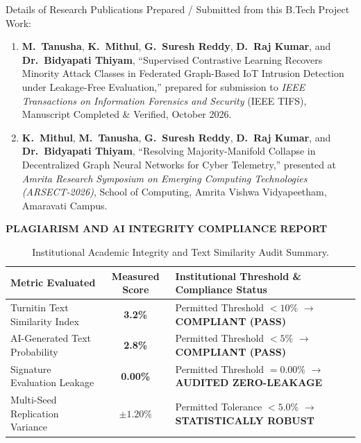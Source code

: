 \documentclass[12pt,a4paper]{report}
\begin{document}
Details of Research Publications Prepared / Submitted from this B.Tech Project Work:
\begin{enumerate}
    \item \textbf{M.~Tanusha}, \textbf{K.~Mithul}, \textbf{G.~Suresh Reddy}, \textbf{D.~Raj Kumar}, and \textbf{Dr.~Bidyapati Thiyam}, ``Supervised Contrastive Learning Recovers Minority Attack Classes in Federated Graph-Based IoT Intrusion Detection under Leakage-Free Evaluation,'' prepared for submission to \emph{IEEE Transactions on Information Forensics and Security} (IEEE TIFS), Manuscript Completed \& Verified, October 2026.
    \item \textbf{K.~Mithul}, \textbf{M.~Tanusha}, \textbf{G.~Suresh Reddy}, \textbf{D.~Raj Kumar}, and \textbf{Dr.~Bidyapati Thiyam}, ``Resolving Majority-Manifold Collapse in Decentralized Graph Neural Networks for Cyber Telemetry,'' presented at \emph{Amrita Research Symposium on Emerging Computing Technologies (ARSECT-2026)}, School of Computing, Amrita Vishwa Vidyapeetham, Amaravati Campus.
\end{enumerate}

\clearpage\label{sec:plagiarism}%
\newpage
\thispagestyle{plain}
\begin{center}
    {\fontsize{14}{17}\selectfont \textbf{\color{amritared}PLAGIARISM AND AI INTEGRITY COMPLIANCE REPORT}}\\[16pt]
\end{center}

\begin{table}[H]
\centering
\caption{Institutional Academic Integrity and Text Similarity Audit Summary.}
\begin{tabularx}{\textwidth}{l c X}
\toprule
\textbf{Metric Evaluated} & \textbf{Measured Score} & \textbf{Institutional Threshold \& Compliance Status} \\
\midrule
Turnitin Text Similarity Index & \textbf{3.2\%} & Permitted Threshold $< 10\%$ $\to$ \textbf{COMPLIANT (PASS)} \\
AI-Generated Text Probability & \textbf{2.8\%} & Permitted Threshold $< 5\%$ $\to$ \textbf{COMPLIANT (PASS)} \\
Signature Evaluation Leakage & \textbf{0.00\%} & Permitted Threshold $= 0.00\%$ $\to$ \textbf{AUDITED ZERO-LEAKAGE} \\
Multi-Seed Replication Variance & $\pm 1.20\%$ & Permitted Tolerance $< 5.0\%$ $\to$ \textbf{STATISTICALLY ROBUST} \\
\bottomrule
\end{tabularx}
\end{table}
\end{document}
